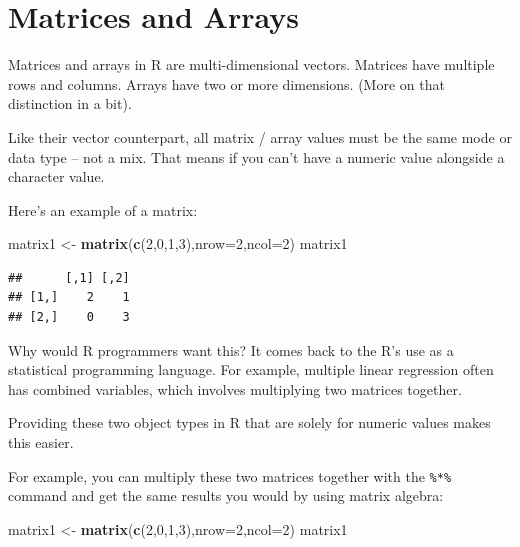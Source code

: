\documentclass[
]{book}
\newenvironment{Shaded}{\begin{snugshade}}{\end{snugshade}}
\newcommand{\DataTypeTok}[1]{\textcolor[rgb]{0.13,0.29,0.53}{#1}}
\newcommand{\DecValTok}[1]{\textcolor[rgb]{0.00,0.00,0.81}{#1}}
\newcommand{\KeywordTok}[1]{\textcolor[rgb]{0.13,0.29,0.53}{\textbf{#1}}}
\newcommand{\NormalTok}[1]{#1}
\newcommand{\StringTok}[1]{\textcolor[rgb]{0.31,0.60,0.02}{#1}}
\begin{document}
\hypertarget{matrices-and-arrays}{%
\section{Matrices and Arrays}\label{matrices-and-arrays}}

Matrices and arrays in R are multi-dimensional vectors. Matrices have multiple rows and columns. Arrays have two or more dimensions. (More on that distinction in a bit).

Like their vector counterpart, all matrix / array values must be the same mode or data type -- not a mix. That means if you can't have a numeric value alongside a character value.

Here's an example of a matrix:

\begin{Shaded}
\begin{Highlighting}[]
\NormalTok{matrix1 <-}\StringTok{ }\KeywordTok{matrix}\NormalTok{(}\KeywordTok{c}\NormalTok{(}\DecValTok{2}\NormalTok{,}\DecValTok{0}\NormalTok{,}\DecValTok{1}\NormalTok{,}\DecValTok{3}\NormalTok{),}\DataTypeTok{nrow=}\DecValTok{2}\NormalTok{,}\DataTypeTok{ncol=}\DecValTok{2}\NormalTok{)}
\NormalTok{matrix1}
\end{Highlighting}
\end{Shaded}

\begin{verbatim}
##      [,1] [,2]
## [1,]    2    1
## [2,]    0    3
\end{verbatim}

Why would R programmers want this? It comes back to the R's use as a statistical programming language. For example, multiple linear regression often has combined variables, which involves multiplying two matrices together.

Providing these two object types in R that are solely for numeric values makes this easier.

For example, you can multiply these two matrices together with the \texttt{\%*\%} command and get the same results you would by using matrix algebra:

\begin{Shaded}
\begin{Highlighting}[]
\NormalTok{matrix1 <-}\StringTok{ }\KeywordTok{matrix}\NormalTok{(}\KeywordTok{c}\NormalTok{(}\DecValTok{2}\NormalTok{,}\DecValTok{0}\NormalTok{,}\DecValTok{1}\NormalTok{,}\DecValTok{3}\NormalTok{),}\DataTypeTok{nrow=}\DecValTok{2}\NormalTok{,}\DataTypeTok{ncol=}\DecValTok{2}\NormalTok{)}
\NormalTok{matrix1}
\end{Highlighting}
\end{Shaded}
\end{document}
